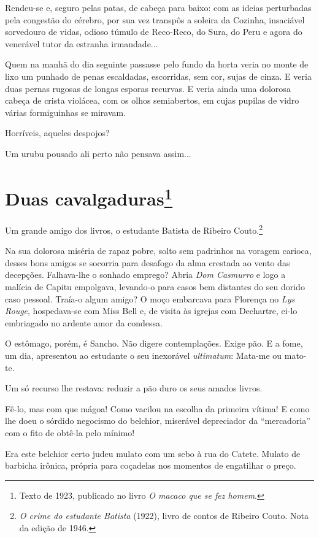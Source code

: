 Rendeu-se e, seguro pelas patas, de cabeça para baixo: com as ideias
perturbadas pela congestão do cérebro, por sua vez transpôs a soleira da
Cozinha, insaciável sorvedouro de vidas, odioso túmulo de Reco-Reco, do
Sura, do Peru e agora do venerável tutor da estranha irmandade...

Quem na manhã do dia seguinte passasse pelo fundo da horta veria no
monte de lixo um punhado de penas escaldadas, escorridas, sem cor, sujas
de cinza. E veria duas pernas rugosas de longas esporas recurvas. E
veria ainda uma dolorosa cabeça de crista violácea, com os olhos
semiabertos, em cujas pupilas de vidro várias formiguinhas se miravam.

Horríveis, aqueles despojos?

Um urubu pousado ali perto não pensava assim...

\chapter{Duas cavalgaduras\footnote[*]{Texto de 1923, publicado no livro \emph{O macaco que se fez homem}.}}

Um grande amigo dos livros, o estudante Batista de Ribeiro
Couto.\footnote{\emph{O crime do estudante Batista} (1922), livro de
  contos de Ribeiro Couto. Nota da edição de 1946.}

Na sua dolorosa miséria de rapaz pobre, solto sem padrinhos na voragem
carioca, desses bons amigos se socorria para desafogo da alma crestada
ao vento das decepções. Falhava-lhe o sonhado emprego? Abria \emph{Dom
Casmurro} e logo a malícia de Capitu empolgava, levando-o para casos bem
distantes do seu dorido caso pessoal. Traía-o algum amigo? O moço
embarcava para Florença no \emph{Lys Rouge}, hospedava-se com Miss Bell
e, de visita às igrejas com Dechartre, ei-lo embriagado no ardente amor
da condessa.

O estômago, porém, é Sancho. Não digere contemplações. Exige pão. E a
fome, um dia, apresentou ao estudante o seu inexorável \emph{ultimatum}:
Mata-me ou mato-te.

Um só recurso lhe restava: reduzir a pão duro os seus amados livros.

Fê-lo, mas com que mágoa! Como vacilou na escolha da primeira vítima! E
como lhe doeu o sórdido negocismo do belchior, miserável depreciador da
``mercadoria'' com o fito de obtê-la pelo mínimo!

Era este belchior certo judeu mulato com um sebo à rua do Catete. Mulato
de barbicha irônica, própria para coçadelas nos momentos de engatilhar o
preço.

